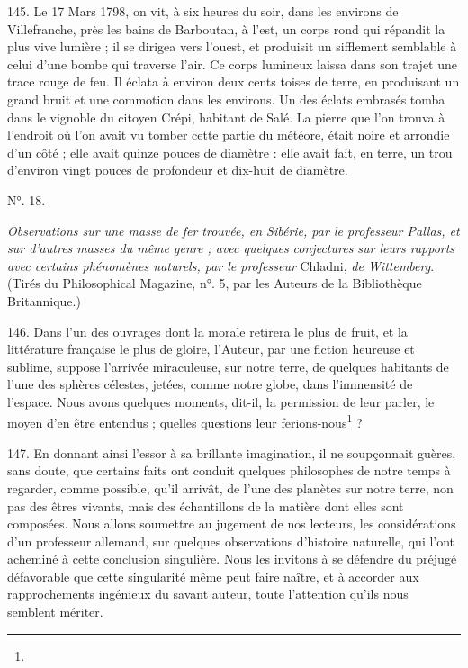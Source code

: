 \documentclass[a4paper, 11pt, oneside, polutonikogreek, french]{article}
\begin{document}
145. \og Le 17 Mars 1798, on vit, à six heures du soir, dans les environs de Villefranche, près les bains de Barboutan, à l'est, un corps rond qui répandit la plus vive lumière ; il se dirigea vers l'ouest, et produisit un sifflement semblable à celui d'une bombe qui traverse l'air. Ce corps lumineux laissa dans son trajet une trace rouge de feu. Il éclata à environ deux cents toises de terre, en produisant un grand bruit et une commotion dans les environs. Un des éclats embrasés tomba dans le vignoble du citoyen Crépi, habitant de Salé. La pierre que l'on trouva à l'endroit où l'on avait vu tomber cette partie du météore, était noire et arrondie d'un côté ; elle avait quinze pouces de diamètre : elle avait fait, en terre, un trou d'environ vingt pouces de profondeur et dix-huit de diamètre. \fg

\begin{center}
N°. 18.
\end{center}

\emph{Observations sur une masse de fer trouvée, en Sibérie, par le professeur Pallas, et sur d'autres masses du même genre ; avec quelques conjectures sur leurs rapports avec certains phénomènes naturels, par le professeur} Chladni, \emph{de Wittemberg}. (Tirés du Philosophical Magazine, n°. 5, par les Auteurs de la Bibliothèque Britannique.)

146. Dans l'un des ouvrages dont la morale retirera le plus de fruit, et la littérature française le plus de gloire, l'Auteur, par une fiction heureuse et sublime, suppose \og l'arrivée miraculeuse, sur notre terre, de quelques habitants de l'une des sphères célestes, jetées, comme notre globe, dans l'immensité de l'espace. Nous avons quelques moments, dit-il, la permission de leur parler, le moyen d'en être entendus ; quelles questions leur ferions-nous\footnote{} ?

147. En donnant ainsi l'essor à sa brillante imagination, il ne soupçonnait guères, sans doute, que certains faits ont conduit quelques philosophes de notre temps à regarder, comme possible, qu'il arrivât, de l'une des planètes sur notre terre, non pas des êtres vivants, mais des échantillons de la matière dont elles sont composées. Nous allons soumettre au jugement de nos lecteurs, les considérations d'un professeur allemand, sur quelques observations d'histoire naturelle, qui l'ont acheminé à cette conclusion singulière. Nous les invitons à se défendre du préjugé défavorable que cette singularité même peut faire naître, et à accorder aux rapprochements ingénieux du savant auteur, toute l'attention qu'ils nous semblent mériter.
\end{document}
